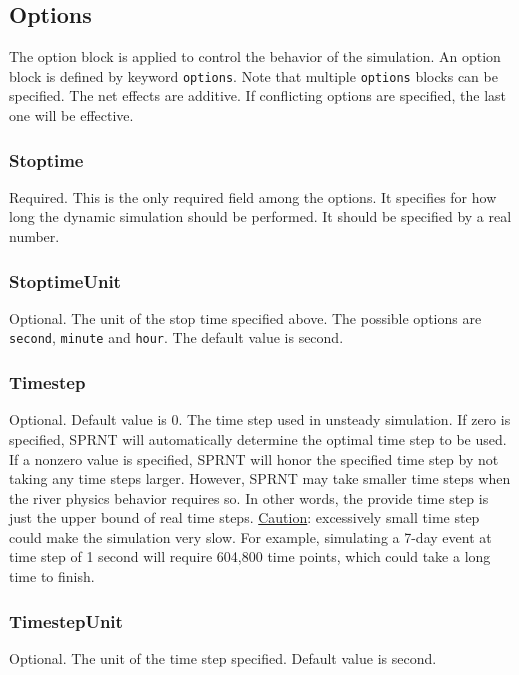 \documentclass[10pt, letterpaper]{article}
\begin{document}
\subsection{Options}
\label{subsec:options}
The option block is applied to control the behavior of the simulation. An option block is
defined by keyword {\tt options}. Note that multiple {\tt options} blocks can be
specified. The net effects are additive. If conflicting options are specified, the last
one will be effective.

\subsubsection{Stoptime}
\label{subsubsec:stoptime}
Required. This is the only required field among the options. It specifies for how long the
dynamic simulation should be performed. It should be specified by a real number.

\subsubsection{StoptimeUnit}
\label{subsubsec:stoptimeu}
Optional. The unit of the stop time specified above. The possible options are {\tt second},
{\tt minute} and {\tt hour}. The default value is second.

\subsubsection{Timestep}
\label{subsubsec:timestep}
Optional. Default value is 0. The time step used in unsteady simulation. If zero is
specified, SPRNT will automatically determine the optimal time step to be used. If a
nonzero value is specified, SPRNT will honor the specified time step by not taking any
time steps larger. However, SPRNT may take smaller time steps when the river physics
behavior requires so. In other words, the provide time step is just the upper bound of
real time steps.  \underline{Caution}: excessively small time step could make the
simulation very slow. For example, simulating a 7-day event at time step of 1 second will
require 604,800 time points, which could take a long time to finish.

\subsubsection{TimestepUnit}
\label{subsubsec:timestepunit}
Optional. The unit of the time step specified. Default value is second.
\end{document}
